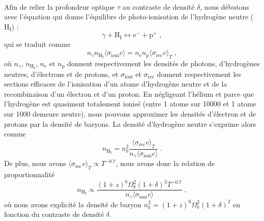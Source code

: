 \paragraph{}
Afin de relier la profondeur optique $\tau$ au contraste de densité $\delta$, nous débutons avec l'équation qui donne l'équilibre de photo-ionisation de l'hydrogène neutre ($\mathrm{H}_{\mathrm{I}}$) :
\begin{equation}
  \gamma + \mathrm{H}_{\mathrm{I}} \leftrightarrow \mathrm{e}^{-} + \mathrm{p}^{+} \; ,
\end{equation}
qui se traduit comme
\begin{equation}
  n_{\gamma} n_{\mathrm{H}_{\mathrm{I}}} \langle \sigma_{\mathrm{ioni}} c \rangle
  = n_{\mathrm{e}} n_{\mathrm{p}} \langle \sigma_{\mathrm{rec}} v \rangle_{T} \; ,
\end{equation}
où $n_{\gamma}$, $n_{\mathrm{H}_{\mathrm{I}}}$, $n_{\mathrm{e}}$ et $n_{\mathrm{p}}$ donnent respectivement les densités de photons, d'hydrogènes neutres, d'électrons et de protons, 
et $ \sigma_{\mathrm{ioni}}$ et $\sigma_{\mathrm{rec}}$ donnent respectivement les sections efficaces de l'ionisation d'un atome d'hydrogène neutre et de la recombinaison d'un électron et d'un proton.
En négligeant l'hélium et parce que l'hydrogène est quasiment totalement ionisé (entre 1 atome sur \num{10000} et 1 atome sur \num{1000} demeure neutre), nous pouvons approximer les densités d'électron et de protons par la densité de baryons. La densité d'hydrogène neutre s'exprime alors comme
\begin{equation}
  n_{\mathrm{H}_{\mathrm{I}}}
  = n_{b}^2 \frac{\langle \sigma_{\mathrm{rec}} v \rangle_{T}}{n_{\gamma} \langle \sigma_{\mathrm{ioni}} c \rangle } \; .
\end{equation}
De plus, nous avons $\langle \sigma_{\mathrm{rec}} v \rangle_{T} \propto T^{-\num{0.7}}$, nous avons donc la relation de proportionnalité
\begin{equation}
  n_{\mathrm{H}_{\mathrm{I}}} \propto \frac{(1+z)^6 \Omega_b^2 (1+\delta)^2 T^{-\num{0.7}}}{n_{\gamma} \langle \sigma_{\mathrm{ioni}} c \rangle} \; ,
\end{equation}
où nous avons explicité la densité de baryon $n_{b}^2 = (1+z)^6 \Omega_b^2 (1+\delta)^2$ en fonction du contraste de densité $\delta$.
